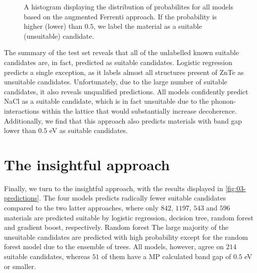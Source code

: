 \begin{figure}[ht!]
    \centering
    
    \vspace*{-130mm}
    \caption{A histogram displaying the distribution of probabilites for all models based on the augmented Ferrenti approach. If the probability is higher (lower) than $0.5$, we label the material as a suitable (unsuitable) candidate.}
    \label{fig:histogram-augmented-ferrenti}
\end{figure}

The summary of the test set reveals that all of the unlabelled known suitable candidates are, in fact, predicted as suitable candidates. Logistic regression predicts a single exception, as it labels almost all structures present of ZnTe as unsuitable candidates. Unfortunately, due to the large number of suitable candidates, it also reveals unqualified predictions. All models confidently predict NaCl as a suitable candidate, which is in fact unsuitable due to the phonon-interactions within the lattice that would substantially increase decoherence. Additionally, we find that this approach also predicts materials with band gap lower than $0.5$ eV as suitable candidates.


\section{The insightful approach}

Finally, we turn to the insightful approach, with the results displayed in \autoref{fig:03-predictions}. The four models predicts radically fewer suitable candidates compared to the two latter approaches, where only $842$, $1197$, $543$ and $596$ materials are predicted suitable by logistic regression, decision tree, random forest and gradient boost, respectively. Random forest  The large majority of the unsuitable candidates are predicted with high probability except for the random forest model due to the ensemble of trees. All models, however, agree on $214$ suitable candidates, whereas $51$ of them have a MP calculated band gap of $0.5$ eV or smaller.



